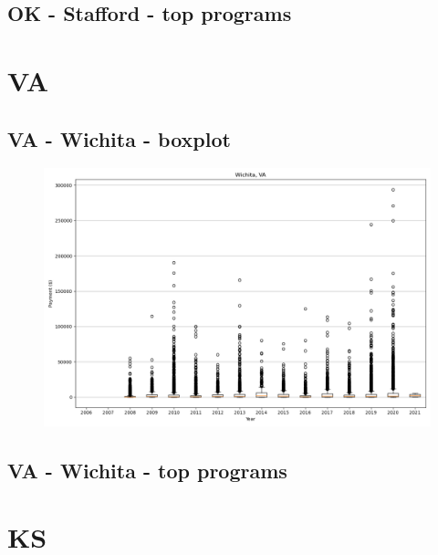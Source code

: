\subsection*{OK - Stafford - top programs}

\newpage
\section*{VA}
\subsection*{VA - Wichita - boxplot}
\begin{figure}[h]
\centering
\includegraphics[width=7in]{../output/boxplots/counties/Wichita-VA_boxplot.png}
\end{figure}


\subsection*{VA - Wichita - top programs}

\newpage
\section*{KS}
